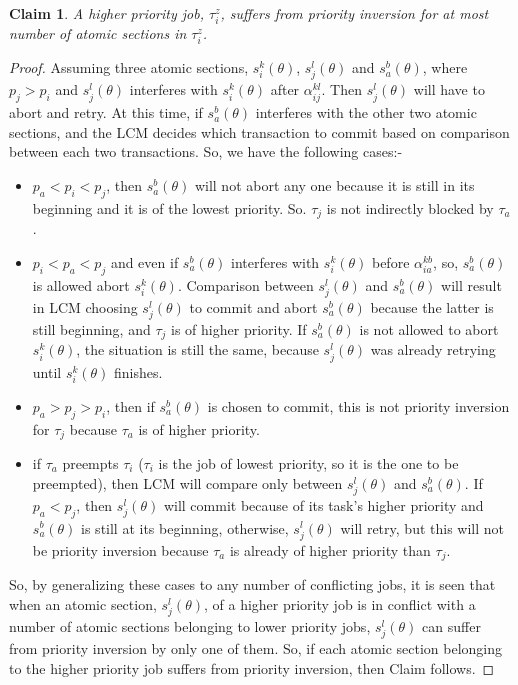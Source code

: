 \documentclass[conference]{IEEEtran}
\newtheorem{clm}{Claim}
\begin{document}
\begin{clm}
\label{priority_inversion}
A higher priority job, $\tau_i^z$, suffers from priority inversion for at most number of atomic sections in $\tau_i^z$.
\end{clm}
\begin{proof}
Assuming three atomic sections, $s_i^k(\theta)$, $s_j^l(\theta)$ and $s_a^b(\theta)$, where $p_j > p_i$ and $s_j^l(\theta)$ interferes with $s_i^k(\theta)$ after $\alpha_{ij}^{kl}$. Then $s_j^l(\theta)$ will have to abort and retry. At this time, if $s_a^b(\theta)$ interferes with the other two atomic sections, and the LCM decides which transaction to commit based on comparison between each two transactions. So, we have the following cases:-
\begin{itemize}
\item $p_a < p_i < p_j$, then $s_a^b(\theta)$ will not abort any one because it is still in its beginning and it is of the lowest priority. So. $\tau_j$ is not indirectly blocked by $\tau_a$.
\item $p_i<p_a<p_j$ and even if $s_a^b(\theta)$ interferes with $s_i^k(\theta)$ before $\alpha_{ia}^{kb}$, so, $s_a^b(\theta)$ is allowed abort $s_i^k(\theta)$. Comparison between $s_j^l(\theta)$ and $s_a^b(\theta)$ will result in LCM choosing $s_j^l(\theta)$ to commit and abort $s_a^b(\theta)$ because the latter is still beginning, and $\tau_j$ is of higher priority. If $s_a^b(\theta)$ is not allowed to abort $s_i^k(\theta)$, the situation is still the same, because $s_j^l(\theta)$ was already retrying until $s_i^k(\theta)$ finishes.
\item $p_a>p_j>p_i$, then if $s_a^b(\theta)$ is chosen to commit, this is not priority inversion for $\tau_j$ because $\tau_a$ is of higher priority.
\item if $\tau_a$ preempts $\tau_i$ ($\tau_i$ is the job of lowest priority, so it is the one to be preempted), then LCM will compare only between $s_j^l(\theta)$ and $s_a^b(\theta)$. If $p_a<p_j$, then $s_j^l(\theta)$ will commit because of its task's higher priority and $s_a^b(\theta)$ is still at its beginning, otherwise, $s_j^l(\theta)$ will retry, but this will not be priority inversion because $\tau_a$ is already of higher priority than $\tau_j$.
\end{itemize}
So, by generalizing these cases to any number of conflicting jobs, it is seen that when an atomic section, $s_j^l(\theta)$, of a higher priority job is in conflict with a number of atomic sections belonging to lower priority jobs, $s_j^l(\theta)$ can suffer from priority inversion by only one of them. So, if each atomic section belonging to the higher priority job suffers from priority inversion, then Claim follows.
\end{proof}
\end{document}
